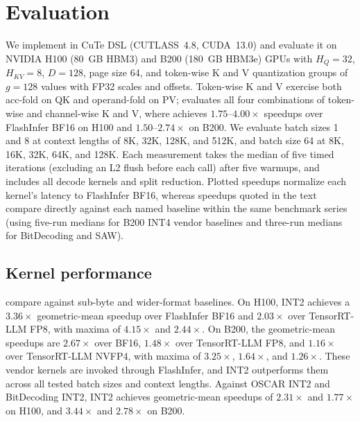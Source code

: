 \section{Evaluation}
\label{sec:eval}

We implement \sys{} in CuTe DSL (CUTLASS~4.8, CUDA~13.0) and evaluate it on NVIDIA H100 (80~GB HBM3) and B200 (180~GB HBM3e) GPUs with $H_Q=32$, $H_{KV}=8$, $D=128$, page size 64, and token-wise K and V quantization groups of $g=128$ values with FP32 scales and offsets.
Token-wise K and V exercise both acc-fold on QK and operand-fold on PV;  evaluates all four combinations of token-wise and channel-wise K and V, where \sys{} achieves $1.75$--$4.00\times$ speedups over FlashInfer BF16 on H100 and $1.50$--$2.74\times$ on B200.
We evaluate batch sizes 1 and 8 at context lengths of 8K, 32K, 128K, and 512K, and batch size 64 at 8K, 16K, 32K, 64K, and 128K.
Each measurement takes the median of five timed iterations (excluding an L2 flush before each call) after five warmups, and includes all decode kernels and split reduction.
Plotted speedups normalize each kernel's latency to FlashInfer BF16, whereas speedups quoted in the text compare \sys{} directly against each named baseline within the same benchmark series (using five-run medians for B200 INT4 vendor baselines and three-run medians for BitDecoding and SAW).

\subsection{Kernel performance}
\label{sec:eval-performance}




 compare \sys{} against sub-byte and wider-format baselines.
On H100, \sys{} INT2 achieves a $3.36\times$ geometric-mean speedup over FlashInfer BF16 and $2.03\times$ over TensorRT-LLM FP8, with maxima of $4.15\times$ and $2.44\times$.
On B200, the geometric-mean speedups are $2.67\times$ over BF16, $1.48\times$ over TensorRT-LLM FP8, and $1.16\times$ over TensorRT-LLM NVFP4, with maxima of $3.25\times$, $1.64\times$, and $1.26\times$.
These vendor kernels are invoked through FlashInfer, and \sys{} INT2 outperforms them across all tested batch sizes and context lengths.
Against OSCAR INT2 and BitDecoding INT2, \sys{} INT2 achieves geometric-mean speedups of $2.31\times$ and $1.77\times$ on H100, and $3.44\times$ and $2.78\times$ on B200.

